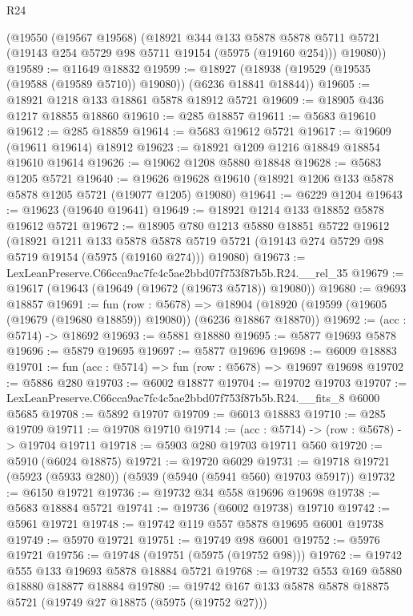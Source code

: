 \begin{lexlean}{R24}
\begin{coremodule}
    (@19550
      (@19567 @19568)
      (@18921
        @344
        @133
        @5878
        @5878
        @5711
        @5721
        (@19143 @254 @5729 @98 @5711 @19154 (@5975 (@19160 @254)))
        @19080))
@19589 := @11649 @18832
@19599 := @18927 (@18938 (@19529 (@19535 (@19588 (@19589 @5710)) @19080)) (@6236 @18841 @18844))
@19605 := @18921 @1218 @133 @18861 @5878 @18912 @5721
@19609 := @18905 @436 @1217 @18855 @18860
@19610 := @285 @18857
@19611 := @5683 @19610
@19612 := @285 @18859
@19614 := @5683 @19612 @5721
@19617 := @19609 (@19611 @19614) @18912
@19623 := @18921 @1209 @1216 @18849 @18854 @19610 @19614
@19626 := @19062 @1208 @5880 @18848
@19628 := @5683 @1205 @5721
@19640 := @19626 @19628 @19610 (@18921 @1206 @133 @5878 @5878 @1205 @5721 (@19077 @1205) @19080)
@19641 := @6229 @1204
@19643 := @19623 (@19640 @19641)
@19649 := @18921 @1214 @133 @18852 @5878 @19612 @5721
@19672 := @18905
    @780
    @1213
    @5880
    @18851
    @5722
    @19612
    (@18921
      @1211
      @133
      @5878
      @5878
      @5719
      @5721
      (@19143 @274 @5729 @98 @5719 @19154 (@5975 (@19160 @274)))
      @19080)
@19673 := LexLeanPreserve.C66cca9ac7fc4c5ae2bbd07f753f87b5b.R24.__rel_35
@19679 := @19617 (@19643 (@19649 (@19672 (@19673 @5718)) @19080))
@19680 := @9693 @18857
@19691 := fun (row : @5678) =>
  @18904 (@18920 (@19599 (@19605 (@19679 (@19680 @18859)) @19080)) (@6236 @18867 @18870))
@19692 := (acc : @5714) -> @18692
@19693 := @5881 @18880
@19695 := @5877 @19693 @5878
@19696 := @5879 @19695
@19697 := @5877 @19696
@19698 := @6009 @18883
@19701 := fun (acc : @5714) => fun (row : @5678) => @19697 @19698
@19702 := @5886 @280
@19703 := @6002 @18877
@19704 := @19702 @19703
@19707 := LexLeanPreserve.C66cca9ac7fc4c5ae2bbd07f753f87b5b.R24.__fits_8 @6000 @5685
@19708 := @5892 @19707
@19709 := @6013 @18883
@19710 := @285 @19709
@19711 := @19708 @19710
@19714 := (acc : @5714) -> (row : @5678) -> @19704 @19711
@19718 := @5903 @280 @19703 @19711 @560
@19720 := @5910 (@6024 @18875)
@19721 := @19720 @6029
@19731 := @19718 @19721 (@5923 (@5933 @280)) (@5939 (@5940 (@5941 @560) @19703 @5917))
@19732 := @6150 @19721
@19736 := @19732 @34 @558 @19696 @19698
@19738 := @5683 @18884 @5721
@19741 := @19736 (@6002 @19738) @19710
@19742 := @5961 @19721
@19748 := @19742 @119 @557 @5878 @19695 @6001 @19738
@19749 := @5970 @19721
@19751 := @19749 @98 @6001
@19752 := @5976 @19721
@19756 := @19748 (@19751 (@5975 (@19752 @98)))
@19762 := @19742 @555 @133 @19693 @5878 @18884 @5721
@19768 := @19732 @553 @169 @5880 @18880 @18877 @18884
@19780 := @19742 @167 @133 @5878 @5878 @18875 @5721 (@19749 @27 @18875 (@5975 (@19752 @27)))

\end{coremodule}
\end{lexlean}
